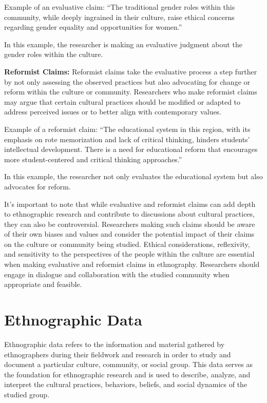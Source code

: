 \documentclass[
  b5paper]{book}
\begin{document}
Example of an evaluative claim: ``The traditional gender roles within this community, while deeply ingrained in their culture, raise ethical concerns regarding gender equality and opportunities for women.''

In this example, the researcher is making an evaluative judgment about the gender roles within the culture.

\textbf{Reformist Claims:} Reformist claims take the evaluative process a step further by not only assessing the observed practices but also advocating for change or reform within the culture or community. Researchers who make reformist claims may argue that certain cultural practices should be modified or adapted to address perceived issues or to better align with contemporary values.

Example of a reformist claim: ``The educational system in this region, with its emphasis on rote memorization and lack of critical thinking, hinders students' intellectual development. There is a need for educational reform that encourages more student-centered and critical thinking approaches.''

In this example, the researcher not only evaluates the educational system but also advocates for reform.

It's important to note that while evaluative and reformist claims can add depth to ethnographic research and contribute to discussions about cultural practices, they can also be controversial. Researchers making such claims should be aware of their own biases and values and consider the potential impact of their claims on the culture or community being studied. Ethical considerations, reflexivity, and sensitivity to the perspectives of the people within the culture are essential when making evaluative and reformist claims in ethnography. Researchers should engage in dialogue and collaboration with the studied community when appropriate and feasible.

\hypertarget{ethnographic-data}{%
\section{Ethnographic Data}\label{ethnographic-data}}

Ethnographic data refers to the information and material gathered by ethnographers during their fieldwork and research in order to study and document a particular culture, community, or social group. This data serves as the foundation for ethnographic research and is used to describe, analyze, and interpret the cultural practices, behaviors, beliefs, and social dynamics of the studied group.
\end{document}

